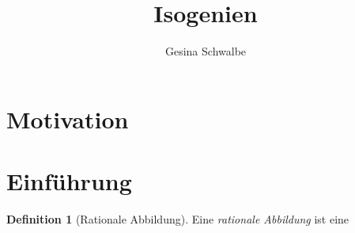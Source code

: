 \documentclass[english, german, parskip=half]{scrartcl}
\title{Isogenien}
\author{Gesina Schwalbe}
\theoremstyle{definition}
\newtheorem{Definition}[Satz]{Definition}
\theoremstyle{remark}
\begin{document}
\maketitle
\tableofcontents

\section{Motivation}

\section{Einführung}
\begin{Definition}[Rationale Abbildung]
  Eine \emph{rationale Abbildung} 
  ist eine

\end{Definition}

\nocite{*}
\printbibliography
\end{document}
